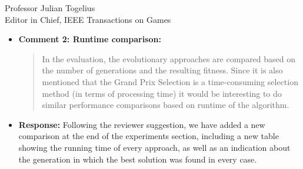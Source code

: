 \documentclass[10pt]{letter} %
\begin{document}
\begin{letter}{Professor Julian Togelius \\ Editor in Chief, IEEE Transactions on Games}
\begin{enumerate}
\begin{itemize}
		We have added this text to the paper in order to clarify what we
		understand by fitnessless:
		{\em Although this selection uses a score that could be assimilated to a fitness, it is actually an extension of a tournament selection policy since it creates tournaments of several individuals, and ``scores'' them according to how they fare in these races. This is not actually a fitness, since it is not intrinsic to the individual. It is indeed equivalent to, in a $n$-tournament selection that is repeated several times, giving a score of $n$ to the first, $n-1$ to the second, and then using this for selection. That score is, thus, not a fitness but actually a way of keeping track of the position of the individual in the different tournaments it has participated; since, in this context, we have no way of evaluating (i.e. assigning a fitness) to a controller but only a way to compare them, we call this approach {\em fitnessless}, as it was called, for instance, in [18].}


		\item {\bf Comment 2: Runtime comparison:
		\begin{quote}
			In the evaluation, the evolutionary approaches are compared based on 		
			the number of generations and the resulting fitness. Since it is also 
			mentioned that the Grand Prix Selection is a time-consuming selection 
			method (in terms of processing time) it would be interesting to do 	
			similar performance comparisons based on runtime of the algorithm.
		\end{quote}
		}
		\item {\bf Response:} Following the reviewer suggestion, we have added a new comparison at the end of the experiments section, including a new table showing the running time of every approach, as well as an indication about the generation in which the best solution was found in every case.



\end{itemize}
\end{enumerate}
\end{letter}
\end{document}
